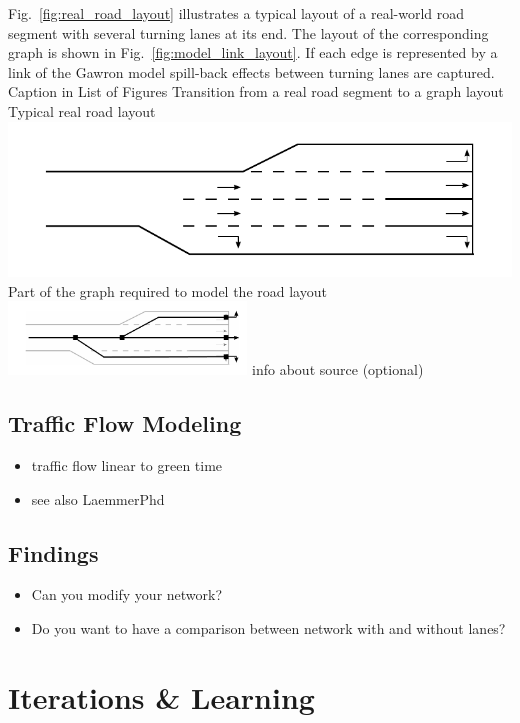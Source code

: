 Fig.~\ref{fig:real_road_layout} illustrates a typical layout of a real-world road segment with several turning lanes at its end. 
The layout of the corresponding graph is shown in Fig.~\ref{fig:model_link_layout}. 
If each edge is represented by a link of the Gawron model spill-back effects between turning lanes are captured. 
\createfigure%
{Caption in List of Figures}%
{Transition from a real road segment to a graph layout}
{\label{fig:combined_model}}
{%
  \createsubfigure%
	{Typical real road layout}
	{\includegraphics[width=0.475\linewidth]{extending/figures/signalslanes/real_road_layout.pdf}}
	{\label{fig:real_road_layout}}
  \createsubfigure%
	{Part of the graph required to model the road layout}
	{\includegraphics[width=0.475\textwidth]{extending/figures/signalslanes/link_lanes_layout}}
	{\label{fig:model_link_layout}}
}%
{info about source (optional)}



\subsection{Traffic Flow Modeling}

\begin{itemize}
	\item traffic flow linear to green time
	\item see also LaemmerPhd
\end{itemize}

\subsection{Findings}

\begin{itemize}
	\item Can you modify your network?
	\item Do you want to have a comparison between network with and without lanes?
\end{itemize}




\section{Iterations \& Learning}
\label{sec:signals_iterations_learning}


